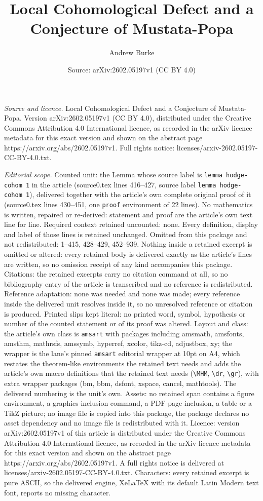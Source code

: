 \documentclass[10pt,a4paper]{amsart}
\title[Local Cohomological Defect and a Conjecture of Mustata-Popa]{Local Cohomological Defect and a Conjecture of Mustata-Popa}
\author{Andrew Burke}
\date{Source: arXiv:2602.05197v1 (CC BY 4.0)}
\begin{document}
\maketitle

\noindent\emph{Source and licence.} Local Cohomological Defect and a Conjecture of Mustata-Popa. Version arXiv:2602.05197v1 (CC BY 4.0), distributed under the Creative Commons Attribution 4.0 International licence, as recorded in the arXiv licence metadata for this exact version and shown on the abstract page https://arxiv.org/abs/2602.05197v1. Full rights notice: licenses/arxiv-2602.05197-CC-BY-4.0.txt.\par\smallskip

\noindent\textit{Editorial scope.} Counted unit: the Lemma whose source label is \texttt{lemma hodge-cohom 1} in the article (source0.tex lines 416--427, source label \texttt{lemma hodge-cohom 1}), delivered together with the article's own complete original proof of it (source0.tex lines 430--451, one \texttt{proof} environment of 22 lines). No mathematics is written, repaired or re-derived: statement and proof are the article's own text line for line. Required context retained uncounted: none. Every definition, display and label of those lines is retained unchanged. Omitted from this package and not redistributed: 1--415, 428--429, 452--939. Nothing inside a retained excerpt is omitted or altered: every retained body is delivered exactly as the article's lines are written, so no omission receipt of any kind accompanies this package. Citations: the retained excerpts carry no citation command at all, so no bibliography entry of the article is transcribed and no reference is redistributed. Reference adaptation: none was needed and none was made; every reference inside the delivered unit resolves inside it, so no unresolved reference or citation is produced. Printed slips kept literal: no printed word, symbol, hypothesis or number of the counted statement or of its proof was altered. Layout and class: the article's own class is \texttt{amsart} with packages including amsmath, amsfonts, amsthm, mathrsfs, amssymb, hyperref, xcolor, tikz-cd, adjustbox, xy; the wrapper is the lane's pinned \texttt{amsart} editorial wrapper at 10pt on A4, which restates the theorem-like environments the retained text needs and adds the article's own macro definitions that the retained text needs (\texttt{\textbackslash MHM}, \texttt{\textbackslash dr}, \texttt{\textbackslash gr}), with extra wrapper packages (bm, bbm, dsfont, xspace, cancel, mathtools). The delivered numbering is the unit's own. Assets: no retained span contains a figure environment, a graphics-inclusion command, a PDF-page inclusion, a table or a TikZ picture; no image file is copied into this package, the package declares no asset dependency and no image file is redistributed with it. Licence: version arXiv:2602.05197v1 of this article is distributed under the Creative Commons Attribution 4.0 International licence, as recorded in the arXiv licence metadata for this exact version and shown on the abstract page https://arxiv.org/abs/2602.05197v1. A full rights notice is delivered at licenses/arxiv-2602.05197-CC-BY-4.0.txt. Characters: every retained excerpt is pure ASCII, so the delivered engine, XeLaTeX with its default Latin Modern text font, reports no missing character.
\end{document}
